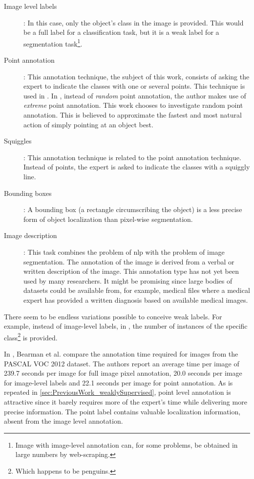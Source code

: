 \begin{description}
    \item[Image level labels]: In this case, only the object's class in the image is provided. 
    This would be a full label for a classification task, but it is a weak label for a segmentation task\footnote{Image with image-level annotation can, for some problems, be obtained in large numbers by web-scraping.}.
    \item[Point annotation]: This annotation technique, the subject of this work, consists of asking the expert to indicate the classes with one or several points. This technique is used in \cite{Laradji2020, Laradji2018, McEver2020}.
    In \cite{Mainis}, instead of \textit{random} point annotation, the author makes use of \textit{extreme} point annotation. This work chooses to investigate random point annotation.
    This is believed to approximate the fastest and most natural action of simply pointing at an object best.
    \item[Squiggles]: This annotation technique is related to the point annotation technique. Instead of points, the expert is asked to indicate the classes with a squiggly line.
    \item[Bounding boxes]: A bounding box (a rectangle circumscribing the object) is a less precise form of object localization than pixel-wise segmentation.
    \item[Image description]: This task combines the problem of \acrlong{nlp} with the problem of image segmentation. The annotation of the image is derived from a verbal or written description of the image. 
    This annotation type has not yet been used by many researchers. 
    It might be promising since large bodies of datasets could be available from, for example, medical files where a medical expert has provided a written diagnosis based on available medical images. 
\end{description}
\par{
    There seem to be endless variations possible to conceive weak labels. 
    For example, instead of image-level labels, in \cite{Laradji2018}, the number of instances of the specific class\footnote{Which happens to be penguins.} is provided. 
}
\par{
    In \cite{Bearman2015}, Bearman et al. compare the annotation time required for images from the PASCAL VOC 2012 dataset.
    The authors report an average time per image of 239.7 seconds per image for full image pixel annotation, 20.0 seconds per image for image-level labels and 22.1 seconds per image for point annotation.
    As is repeated in \ref{sec:PreviousWork_weaklySupervised}, point level annotation is attractive since it barely requires more of the expert's time while delivering more precise information.
    The point label contains valuable localization information, absent from the image level annotation.
}
